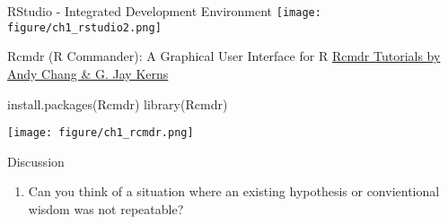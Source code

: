 \documentclass[
  ignorenonframetext,
]{beamer}
\newenvironment{Shaded}{\begin{snugshade}}{\end{snugshade}}
\newcommand{\FunctionTok}[1]{\textcolor[rgb]{0.00,0.00,0.00}{#1}}
\newcommand{\NormalTok}[1]{#1}
\providecommand{\tightlist}{%
  \setlength{\itemsep}{0pt}\setlength{\parskip}{0pt}}
\begin{document}
\begin{frame}{RStudio - Integrated Development Environment}
\protect\hypertarget{rstudio---integrated-development-environment}{}
\texttt{[image: figure/ch1\_rstudio2.png]}
\end{frame}

\begin{frame}[fragile]{Rcmdr (R Commander): A Graphical User Interface
for R}
\protect\hypertarget{rcmdr-r-commander-a-graphical-user-interface-for-r}{}
\href{http://gchang.people.ysu.edu/r/R_Instructions.html}{Rcmdr
Tutorials by Andy Chang \& G. Jay Kerns}

\begin{Shaded}
\begin{Highlighting}[]
\FunctionTok{install.packages}\NormalTok{(Rcmdr)}
\FunctionTok{library}\NormalTok{(Rcmdr)}
\end{Highlighting}
\end{Shaded}

\texttt{[image: figure/ch1\_rcmdr.png]}
\end{frame}

\begin{frame}{Discussion}
\protect\hypertarget{discussion}{}
\begin{enumerate}
\tightlist
\item
  Can you think of a situation where an existing hypothesis or
  convientional wisdom was not repeatable?
\end{enumerate}
\end{frame}
\end{document}
